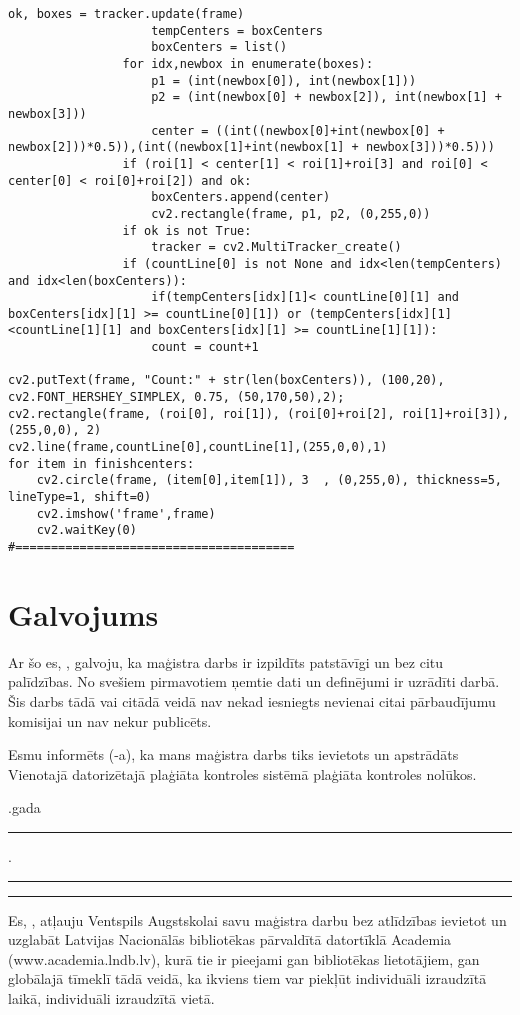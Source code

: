 \documentclass[12pt,paper=a4]{report}
\begin{document}
\begin{lstlisting}[basicstyle=\tiny]
					ok, boxes = tracker.update(frame)
					tempCenters = boxCenters
					boxCenters = list()
				for idx,newbox in enumerate(boxes):
					p1 = (int(newbox[0]), int(newbox[1]))
					p2 = (int(newbox[0] + newbox[2]), int(newbox[1] + newbox[3]))
					center = ((int((newbox[0]+int(newbox[0] + newbox[2]))*0.5)),(int((newbox[1]+int(newbox[1] + newbox[3]))*0.5)))
				if (roi[1] < center[1] < roi[1]+roi[3] and roi[0] < center[0] < roi[0]+roi[2]) and ok:
					boxCenters.append(center)
					cv2.rectangle(frame, p1, p2, (0,255,0))
				if ok is not True:
					tracker = cv2.MultiTracker_create() 
				if (countLine[0] is not None and idx<len(tempCenters) and idx<len(boxCenters)):
					if(tempCenters[idx][1]< countLine[0][1] and boxCenters[idx][1] >= countLine[0][1]) or (tempCenters[idx][1]<countLine[1][1] and boxCenters[idx][1] >= countLine[1][1]):
					count = count+1

cv2.putText(frame, "Count:" + str(len(boxCenters)), (100,20), cv2.FONT_HERSHEY_SIMPLEX, 0.75, (50,170,50),2); 
cv2.rectangle(frame, (roi[0], roi[1]), (roi[0]+roi[2], roi[1]+roi[3]), (255,0,0), 2)
cv2.line(frame,countLine[0],countLine[1],(255,0,0),1)
for item in finishcenters:
	cv2.circle(frame, (item[0],item[1]), 3  , (0,255,0), thickness=5, lineType=1, shift=0)
	cv2.imshow('frame',frame)
	cv2.waitKey(0)
#=======================================
\end{lstlisting}
\pagestyle{empty}

\chapter*{Galvojums}
Ar šo es, , galvoju, ka maģistra darbs ir izpildīts patstāvīgi un bez citu palīdzības. No svešiem pirmavotiem ņemtie dati un definējumi ir uzrādīti darbā. Šis darbs tādā vai citādā veidā nav nekad iesniegts nevienai citai pārbaudījumu komisijai un nav nekur publicēts.

Esmu informēts (-a), ka mans maģistra darbs tiks ievietots un apstrādāts Vienotajā datorizētajā plaģiāta kontroles sistēmā plaģiāta kontroles nolūkos.

\vspace{2cm}
.gada \rule{1cm}{0.2pt}.\rule{3cm}{0.2pt}\hspace{4cm}\rule{4cm}{0.2pt}
\vspace{1cm}

Es, , atļauju Ventspils Augstskolai savu maģistra darbu bez atlīdzības ievietot un uzglabāt Latvijas Nacionālās bibliotēkas pārvaldītā datortīklā Academia\\ (www.academia.lndb.lv), kurā tie ir pieejami gan bibliotēkas lietotājiem, gan globālajā tīmeklī tādā veidā, ka ikviens tiem var piekļūt individuāli izraudzītā laikā, individuāli izraudzītā vietā.
\end{document}
